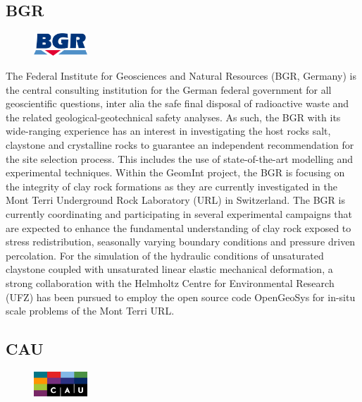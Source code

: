 \subsection{BGR}
\begin{figure}
\centering
\includegraphics[width=2cm]{./figures/BGR_Logo.png}
\end{figure}
The Federal Institute for Geosciences and Natural Resources (BGR, Germany) is the central consulting institution for the German federal government for all geoscientific questions, inter alia the safe final disposal of radioactive waste and the related geological-geotechnical safety analyses. As such, the BGR with its wide-ranging experience has an interest in investigating the host rocks salt, claystone and crystalline rocks to guarantee an independent recommendation for the site selection process. This includes the use of state-of-the-art modelling and experimental techniques. Within the GeomInt project, the BGR is focusing on the integrity of clay rock formations as they are currently investigated in the Mont Terri Underground Rock Laboratory (URL) in Switzerland. The BGR is currently coordinating and participating in several experimental campaigns that are expected to enhance the fundamental understanding of clay rock exposed to stress redistribution, seasonally varying boundary conditions and pressure driven percolation. For the simulation of the hydraulic conditions of unsaturated claystone coupled with unsaturated linear elastic mechanical deformation, a strong collaboration with the Helmholtz Centre for Environmental Research (UFZ) has been pursued to employ the open source code OpenGeoSys for in-situ scale problems of the Mont Terri URL.

\subsection{CAU}
\begin{figure}
\centering
\includegraphics[width=2cm]{./figures/cau_logo.png}
\end{figure}

